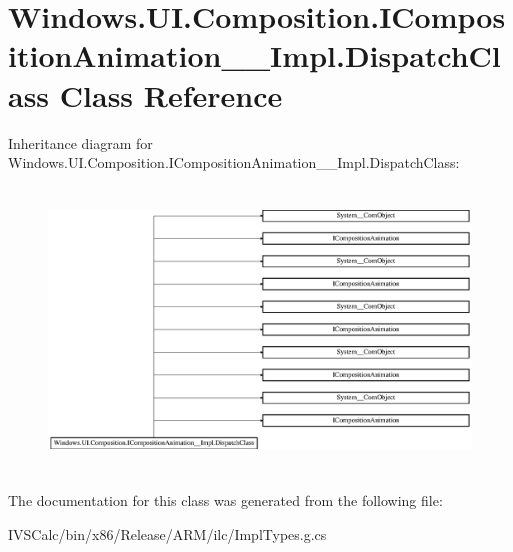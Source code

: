 \hypertarget{class_windows_1_1_u_i_1_1_composition_1_1_i_composition_animation_____impl_1_1_dispatch_class}{}\section{Windows.\+U\+I.\+Composition.\+I\+Composition\+Animation\+\_\+\+\_\+\+Impl.\+Dispatch\+Class Class Reference}
\label{class_windows_1_1_u_i_1_1_composition_1_1_i_composition_animation_____impl_1_1_dispatch_class}
Inheritance diagram for Windows.\+U\+I.\+Composition.\+I\+Composition\+Animation\+\_\+\+\_\+\+Impl.\+Dispatch\+Class\+:\begin{figure}[H]
\begin{center}
\leavevmode
\includegraphics[height=7.567567cm]{class_windows_1_1_u_i_1_1_composition_1_1_i_composition_animation_____impl_1_1_dispatch_class}
\end{center}
\end{figure}


The documentation for this class was generated from the following file\+:\begin{DoxyCompactItemize}
\item 
I\+V\+S\+Calc/bin/x86/\+Release/\+A\+R\+M/ilc/Impl\+Types.\+g.\+cs\end{DoxyCompactItemize}
